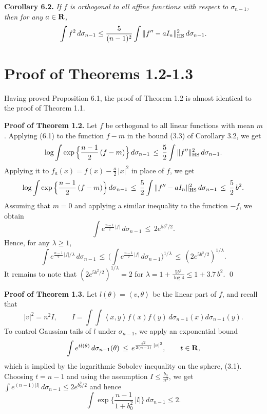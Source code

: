 \documentclass[reqno,12pt]{amsart}
\theoremstyle{plain}
\begin{document}
\vskip5mm
{\bf Corollary 6.2.} {\it If $f$ is orthogonal to all 
affine functions with respect to $\sigma_{n-1}$, then for any $a \in {{\bf R}}$,
$$
\int f^2\,d\sigma_{n-1} \leq \frac{5}{(n-1)^2}
\int \|f'' - aI_n\|_{\rm HS}^2\,d\sigma_{n-1}.
$$
}

\vskip10mm
\section{{\bf Proof of Theorems 1.2-1.3}}
\setcounter{equation}{0}

\vskip2mm
\noindent
Having proved Proposition 6.1, the proof of Theorem 1.2 is almost identical 
to the proof of Theorem 1.1. 

\vskip5mm
{\bf Proof of Theorem 1.2.}
Let $f$ be orthogonal to all linear functions with mean $m$. Applying (6.1) 
to the function $f-m$ in the bound (3.3) of Corollary 3.2, we get
$$
\log
\int \exp\Big\{\frac{n-1}{2}\, (f-m)\Big\}\,d\sigma_{n-1} \, \leq \, 
\frac{5}{2} \int  \|f''\|_{{\rm HS}}^2\,d\sigma_{n-1}.
$$
Applying it to $f_a(x) = f(x) - \frac{a}{2}\,|x|^2$ in place of $f$, we get
$$
\log
\int \exp\Big\{\frac{n-1}{2}\, (f-m)\Big\}\,d\sigma_{n-1} \, \leq \, 
\frac{5}{2} \int  \|f'' - aI_n\|_{{\rm HS}}^2\,d\sigma_{n-1}
 \, \leq \, \frac{5}{2}\,b^2.
$$
Assuming that $m=0$ and applying a similar inequality to the function $-f$,
we obtain
$$
\int e^{\frac{n-1}{2}\, |f|}\,d\sigma_{n-1} \, \leq \, 2 e^{5 b^2/2}.
$$
Hence, for any $\lambda \geq 1$,
$$
\int e^{\frac{n-1}{2}\, |f|/\lambda}\,d\sigma_{n-1}
 \, \leq \,
\Big(\int e^{\frac{n-1}{2}\, |f|}\,d\sigma_{n-1}\Big)^{1/\lambda} \, \leq \, 
 (2e^{5b^2/2})^{1/\lambda}.
$$
It remains to note that $(2e^{5b^2/2})^{1/\lambda} = 2$
for $\lambda = 1 + \frac{5b^2}{\log 4} \leq 1 + 3.7\,b^2$.
\qed

\vskip5mm
{\bf Proof of Theorem 1.3.} Let $l(\theta) = \left<v,\theta\right>$ be
the linear part of $f$, and recall that
$$
|v|^2 = n^2 I, \qquad
I = \int\!\!\! \int
\left<x,y\right> f(x)f(y)\,d\sigma_{n-1}(x)d\sigma_{n-1}(y).
$$
To control Gaussian tails of $l$ under $\sigma_{n-1}$, we apply 
an exponential bound
$$
\int e^{t l(\theta)}\,d\sigma_{n-1}(\theta) \, \leq \,
e^{\frac{t^2}{2(n-1)}\,|v|^2}, \qquad t \in {{\bf R}},
$$
which is implied by the logarithmic Sobolev inequality on the sphere, (3.1).
Choosing $t = n-1$ and using the assumption $I \leq \frac{b_0}{n^3}$, we get
$\int e^{(n-1) |l|}\,d\sigma_{n-1} \leq 2 e^{b_0^2/2}$ and hence
$$
\int \exp\Big\{\frac{n-1}{1+b_0^2}\, |l|\Big\}\, d\sigma_{n-1} \leq 2.
$$
\end{document}

